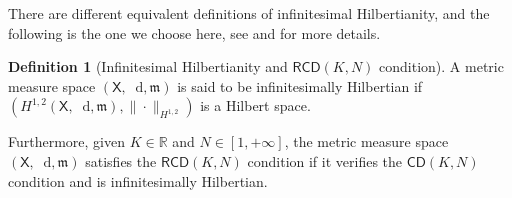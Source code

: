 \documentclass[11pt,twoside,a4paper]{article}
\newcommand{\blue}{\color{blue}}
\newcommand*\diff{\mathop{}\!\mathrm{d}}
\newcommand{\R}{\mathbb{R}}
\newcommand{\cd}{\mathsf{CD}}
\newcommand{\RCD}{\mathsf{RCD}}
\newcommand{\X}{\mathsf{X}}
\newcommand{\m}{\mathfrak m} %
\theoremstyle{theorem}
\theoremstyle{definition}
\newtheorem{definition}[theorem]{Definition}
\theoremstyle{remark}
\theoremstyle{proof}
\begin{document}
There are different equivalent definitions of infinitesimal Hilbertianity, and the following is the one we choose here, see \cite{Gigli12} and \cite{Ambrosio2013} for more details.

\begin{definition}[Infinitesimal Hilbertianity and $\RCD(K,N)$ condition]
    A metric measure space $(\X,\diff,\m)$ is said to be infinitesimally Hilbertian if $(H^{1,2}(\X,\diff,\m),\|\cdot\|_{H^{1,2}})$ is a Hilbert space.

    Furthermore, given $K\in\R$ and $N\in[1,+\infty]$, the metric measure space $(\X,\diff,\m)$ satisfies the $\RCD(K,N)$ condition if it verifies the $\cd(K,N)$ condition and is infinitesimally Hilbertian.
\end{definition}


\end{document}
